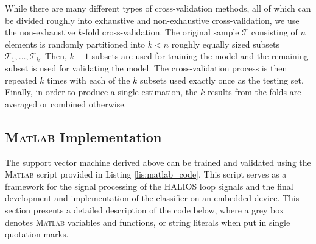 While there are many different types of cross-validation methods, all of which can be divided roughly into exhaustive and non-exhaustive cross-validation, we use the non-exhaustive $k$-fold cross-validation. The original sample $\mathcal{T}$ consisting of $n$ elements is randomly partitioned into $k < n$ roughly equally sized subsets $\mathcal{T}_1, \dots, \mathcal{T}_k$. Then, $k - 1$ subsets are used for training the model and the remaining subset is used for validating the model. The cross-validation process is then repeated $k$ times with each of the $k$ subsets used exactly once as the testing set. Finally, in order to produce a single estimation, the $k$ results from the folds are averaged or combined otherwise.


\subsection{\textsc{Matlab}\textsuperscript{\textregistered} Implementation}

The support vector machine derived above can be trained and validated using the \textsc{Matlab}\textsuperscript{\textregistered} script provided in Listing \ref{lis:matlab_code}. This script serves as a framework for the signal processing of the HALIOS\textsuperscript{\textregistered} loop signals and the final development and implementation of the classifier on an embedded device. This section presents a detailed description of the code below, where a grey box denotes \textsc{Matlab}\textsuperscript{\textregistered} variables and functions, or string literals when put in single quotation marks.

